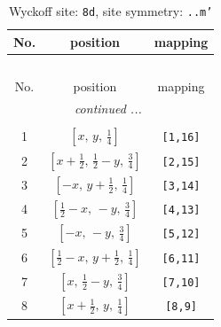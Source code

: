 \documentclass[fleqn,8pt]{jsarticle}
\begin{document}
\begin{longtable}{ccc}
\caption{Wyckoff site: {\tt 8d}, site symmetry: {\tt ..m'}}
 \\
 \hline \hline
No. & position & mapping \\ \hline \endfirsthead

\multicolumn{2}{l}{\tablename\ \thetable{}} \\
 \hline \hline
No. & position & mapping \\ \hline \endhead

 \hline \hline
\multicolumn{2}{r}{\footnotesize\it continued ...} \\ \endfoot

 \hline \hline
\multicolumn{2}{r}{} \\ \endlastfoot

1 & $\left[ x,\, y,\, \frac{1}{4} \right]$ & {\tt [1,16]} \\ \hline
2 & $\left[ x + \frac{1}{2},\, \frac{1}{2} - y,\, \frac{3}{4} \right]$ & {\tt [2,15]} \\ \hline
3 & $\left[ - x,\, y + \frac{1}{2},\, \frac{1}{4} \right]$ & {\tt [3,14]} \\ \hline
4 & $\left[ \frac{1}{2} - x,\, - y,\, \frac{3}{4} \right]$ & {\tt [4,13]} \\ \hline
5 & $\left[ - x,\, - y,\, \frac{3}{4} \right]$ & {\tt [5,12]} \\ \hline
6 & $\left[ \frac{1}{2} - x,\, y + \frac{1}{2},\, \frac{1}{4} \right]$ & {\tt [6,11]} \\ \hline
7 & $\left[ x,\, \frac{1}{2} - y,\, \frac{3}{4} \right]$ & {\tt [7,10]} \\ \hline
8 & $\left[ x + \frac{1}{2},\, y,\, \frac{1}{4} \right]$ & {\tt [8,9]} \\
\end{longtable}
\renewcommand{\arraystretch}{1.2}
\end{document}
